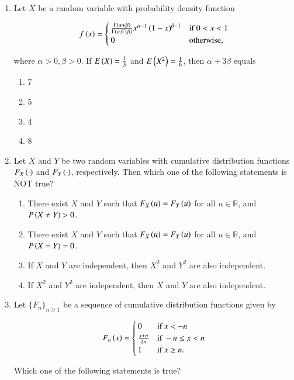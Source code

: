 \documentclass[journal]{IEEEtran}
\numberwithin{equation}{enumi}
\numberwithin{figure}{enumi}
\begin{document}
\begin{enumerate}
\item Let $X$ be a random variable with probability density function

\[
f\left(x\right) = \begin{cases}
\frac{\Gamma\left(\alpha+\beta\right)}{\Gamma\left(\alpha\right)\Gamma\left(\beta\right)}x^{\alpha-1}\left(1-x\right)^{\beta-1} & \text{if } 0 < x < 1 \\
0 & \text{otherwise,}
\end{cases} 
\]

where $\alpha > 0, \beta > 0$. If $E\left(X\right) = \frac{1}{3}$ and $E\left(X^2\right) = \frac{1}{6}$, then $\alpha + 3\beta$ equals

\begin{enumerate}
    \item 7
    \item 5
    \item 4
    \item 8
\end{enumerate}

\item Let $X$ and $Y$ be two random variables with cumulative distribution functions $F_X\left(\cdot\right)$ and $F_Y\left(\cdot\right)$, respectively. Then which one of the following statements is NOT true?

\begin{enumerate}
    \item There exist $X$ and $Y$ such that $F_X\left(u\right) = F_Y\left(u\right)$ for all $u \in \mathbb{R}$, and $P\left(X \neq Y\right) > 0$.
    \item There exist $X$ and $Y$ such that $F_X\left(u\right) = F_Y\left(u\right)$ for all $u \in \mathbb{R}$, and $P\left(X = Y\right) = 0$.
    \item If $X$ and $Y$ are independent, then $X^2$ and $Y^2$ are also independent.
    \item If $X^2$ and $Y^2$ are independent, then $X$ and $Y$ are also independent.
\end{enumerate}

\item Let $\{F_n\}_{n\geq1}$ be a sequence of cumulative distribution functions given by 

\[
F_n\left(x\right) = \begin{cases}
0 & \text{if } x < -n \\
\frac{x+n}{2n} & \text{if } -n \leq x < n \\
1 & \text{if } x \geq n.
\end{cases}
\]

Which one of the following statements is true?


\end{enumerate}
\end{document}
